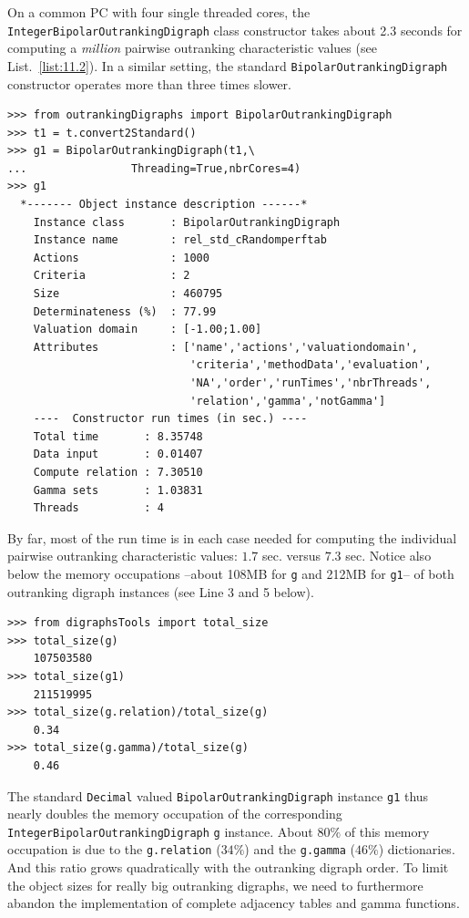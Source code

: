 On a common PC with four single threaded cores, the \texttt{Inte\-ger\-BipolarOutrankingDigraph} class constructor takes about 2.3 seconds for computing a \emph{million} pairwise outranking characteristic values (see List.~\vref{list:11.2}). In a similar setting, the standard \texttt{BipolarOutranking\-Digraph} constructor operates more than three times slower.
\begin{lstlisting}
>>> from outrankingDigraphs import BipolarOutrankingDigraph
>>> t1 = t.convert2Standard()
>>> g1 = BipolarOutrankingDigraph(t1,\
...                Threading=True,nbrCores=4)
>>> g1
  *------- Object instance description ------*
    Instance class       : BipolarOutrankingDigraph
    Instance name        : rel_std_cRandomperftab
    Actions              : 1000
    Criteria             : 2
    Size                 : 460795
    Determinateness (%)  : 77.99
    Valuation domain     : [-1.00;1.00]
    Attributes           : ['name','actions','valuationdomain',
                            'criteria','methodData','evaluation',
                            'NA','order','runTimes','nbrThreads',
                            'relation','gamma','notGamma']
    ----  Constructor run times (in sec.) ----
    Total time       : 8.35748
    Data input       : 0.01407
    Compute relation : 7.30510
    Gamma sets       : 1.03831
    Threads          : 4
\end{lstlisting}

By far, most of the run time is in each case needed for computing the individual pairwise outranking characteristic values: $1.7$ sec. versus $7.3$ sec. Notice also below the memory occupations --about 108MB for \texttt{g} and 212MB for \texttt{g1}-- of both outranking digraph instances (see Line 3 and 5 below).
\begin{lstlisting}
>>> from digraphsTools import total_size
>>> total_size(g)
    107503580
>>> total_size(g1)
    211519995
>>> total_size(g.relation)/total_size(g)
    0.34
>>> total_size(g.gamma)/total_size(g)
    0.46
\end{lstlisting}

The standard \texttt{Decimal} valued \texttt{BipolarOutrankingDigraph} instance \texttt{g1} thus nearly doubles the memory occupation of the corresponding \texttt{IntegerBipo\-larOutrankingDigraph} \texttt{g} instance. About $80\%$ of this memory occupation is due to the \texttt{g.relation} ($34\%$) and the \texttt{g.gamma} ($46\%$) dictionaries. And this ratio grows quadratically with the outranking digraph order. To limit the object sizes for really big outranking digraphs, we need to furthermore abandon the implementation of complete adjacency tables and gamma functions.

